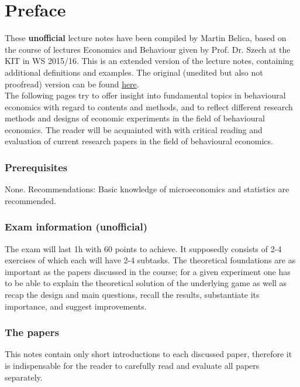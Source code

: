 

\chapter*{Preface}

These \textbf{unofficial} lecture notes have been compiled by Martin Belica, based on the course of lectures Economics and Behaviour given by Prof. Dr. Szech at the KIT in WS 2015/16. This is an extended version of the lecture notes, containing additional definitions and examples. The original (unedited but also not proofread) version can be found \href{http://goo.gl/EOC2Kh}{here}. \\

The following pages try to offer insight into fundamental topics in behavioural economics with regard to contents and methods, and to reflect different research methods and designs of economic experiments in the field of behavioural economics. The reader will be acquainted with with critical reading and evaluation of current research papers in the field of behavioural economics. \\

\subsection*{Prerequisites}
None. Recommendations: Basic knowledge of microeconomics and statistics are recommended. \\

\subsection*{Exam information  (unofficial)} 
The exam will last 1h with 60 points to achieve. It supposedly consists of 2-4 exercises of which each will have 2-4 subtasks. The theoretical foundations are as important as the papers discussed in the course; for a given experiment one has to be able to explain the theoretical solution of the underlying game as well as recap the design and main questions, recall the results, substantiate its importance, and suggest improvements. \\

\subsection*{The papers} 
This notes contain only short introductions to each discussed paper, therefore it is indispensable for the reader to carefully read and evaluate all papers separately.
